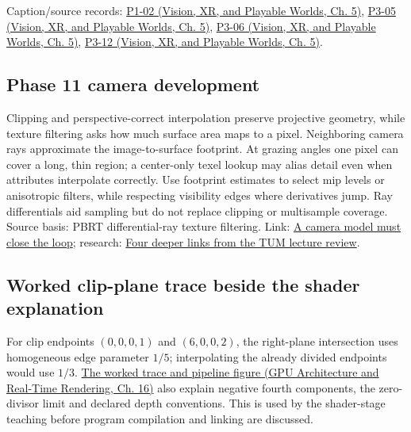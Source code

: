 Caption/source records: \href{../07-Vision-XR-and-Playable-Worlds/main.pdf\#nameddest=04-visual-computing-ii-ch036-p1-02---module-1.2-course-intro-administrivia-part-2-graphics-visual-computing-2026}{P1-02 (Vision, XR, and Playable Worlds, Ch. 5)}, \href{../07-Vision-XR-and-Playable-Worlds/main.pdf\#nameddest=04-visual-computing-ii-ch036-p3-05---the-camera-transform}{P3-05 (Vision, XR, and Playable Worlds, Ch. 5)}, \href{../07-Vision-XR-and-Playable-Worlds/main.pdf\#nameddest=04-visual-computing-ii-ch036-p3-06---clipping}{P3-06 (Vision, XR, and Playable Worlds, Ch. 5)}, \href{../07-Vision-XR-and-Playable-Worlds/main.pdf\#nameddest=04-visual-computing-ii-ch036-p3-12---scan-conversion}{P3-12 (Vision, XR, and Playable Worlds, Ch. 5)}.

\subsection{Phase 11 camera development}\label{appendix-40426e4b2103-phase-11-camera-development}

Clipping and perspective-correct interpolation preserve projective geometry, while texture filtering asks how much surface area maps to a pixel. Neighboring camera rays approximate the image-to-surface footprint. At grazing angles one pixel can cover a long, thin region; a center-only texel lookup may alias detail even when attributes interpolate correctly. Use footprint estimates to select mip levels or anisotropic filters, while respecting visibility edges where derivatives jump. Ray differentials aid sampling but do not replace clipping or multisample coverage. Source basis: PBRT differential-ray texture filtering. Link: \hyperref[02-foundations-ii-ch037-a-camera-model-must-close-the-loop]{A camera model must close the loop}; research: \hyperref[02-foundations-ii-ch036-four-deeper-links-from-the-tum-lecture-review]{Four deeper links from the TUM lecture review}.

\subsection{Worked clip-plane trace beside the shader explanation}\label{appendix-40426e4b2103-worked-clip-plane-trace-beside-the-shader-explanation}

For clip endpoints \((0,0,0,1)\) and \((6,0,0,2)\), the right-plane intersection uses homogeneous edge parameter \(1/5\); interpolating the already divided endpoints would use \(1/3\). \href{../06-GPU-Architecture-and-Real-Time-Rendering/main.pdf\#nameddest=06-engine-ii-ch025-clip-coordinates-are-not-normalized-device-coordinates}{The worked trace and pipeline figure (GPU Architecture and Real-Time Rendering, Ch. 16)} also explain negative fourth components, the zero-divisor limit and declared depth conventions. This is used by the shader-stage teaching before program compilation and linking are discussed.

